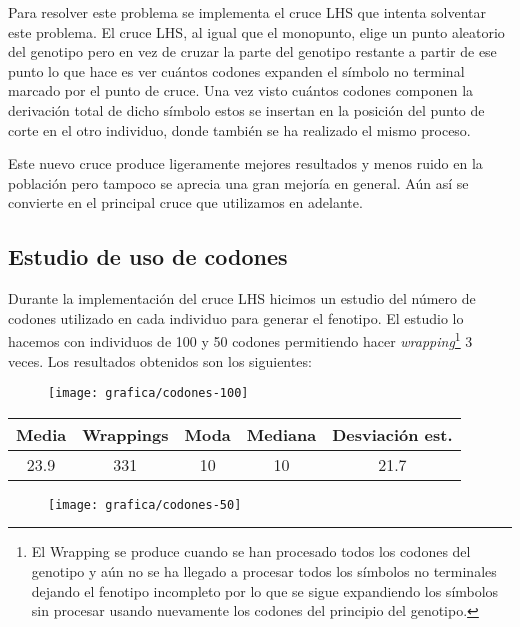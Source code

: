 Para resolver este problema se implementa el cruce LHS que intenta solventar este problema. El cruce LHS, al igual que el monopunto, elige un punto aleatorio del genotipo pero en vez de cruzar la parte del genotipo restante a partir de ese punto lo que hace es ver cuántos codones expanden el símbolo no terminal marcado por el punto de cruce. Una vez visto cuántos codones componen la derivación total de dicho símbolo estos se insertan en la posición del punto de corte en el otro individuo, donde también se ha realizado el mismo proceso.

Este nuevo cruce produce ligeramente mejores resultados y menos ruido en la población pero tampoco se aprecia una gran mejoría en general. Aún así se convierte en el principal cruce que utilizamos en adelante.

\subsection{Estudio de uso de codones}
Durante la implementación del cruce LHS hicimos un estudio del número de codones utilizado en cada individuo para generar el fenotipo. El estudio lo hacemos con individuos de 100 y 50 codones permitiendo hacer \textit{wrapping}\footnote{El Wrapping se produce cuando se han procesado todos los codones del genotipo y aún no se ha llegado a procesar todos los símbolos no terminales dejando el fenotipo incompleto por lo que se sigue expandiendo los símbolos sin procesar usando nuevamente los codones del principio del genotipo.} 3 veces.  Los resultados obtenidos son los siguientes:
\begin{figure}[H]
\centering
\texttt{[image: grafica/codones-100]}
\end{figure}

\begin{table}[H]
\centering
\begin{tabular}{ccccc}
\hline
\textbf{Media} & \textbf{Wrappings} & \textbf{Moda} & \textbf{Mediana} & \textbf{Desviación  est.} \\ \hline
23.9           & 331                & 10            & 10               & 21.7                      \\ \hline
\end{tabular}
\end{table}

\begin{figure}[H]
\centering
\texttt{[image: grafica/codones-50]}
\end{figure}

